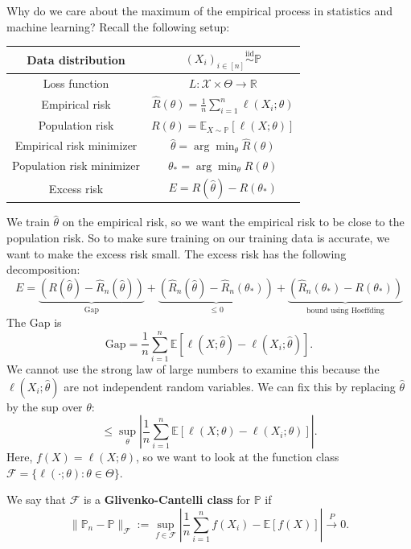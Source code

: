 Why do we care about the maximum of the empirical process in statistics and machine learning? Recall the following setup:
\begin{center}
\begin{tabular}{c|c}
Data distribution & $(X_i)_{i \in [n]} \overset{\text{iid}}{\sim} \mathbb{P}$ \\
\hline
Loss function & $L : \mathcal{X} \times \Theta \to \mathbb{R}$ \\
\hline
Empirical risk & $\widehat{R}(\theta) = \frac{1}{n} \sum_{i=1}^n \ell(X_i; \theta)$ \\
\hline
Population risk & $R(\theta) = \mathbb{E}_{X \sim \mathbb{P}}[\ell(X; \theta)]$ \\
\hline
Empirical risk minimizer & $\hat{\theta} = \arg\min_\theta \widehat{R}(\theta)$ \\
\hline
Population risk minimizer & $\theta_* = \arg\min_\theta R(\theta)$ \\
\hline
Excess risk & $E = R(\hat{\theta}) - R(\theta_*)$ \\
\end{tabular}
\end{center}

We train $\hat{\theta}$ on the empirical risk, so we want the empirical risk to be close to the population risk. So to make sure training on our training data is accurate, we want to make the excess risk small. The excess risk has the following decomposition:
\[
E = \underbrace{(R(\hat{\theta}) - \widehat{R}_n(\hat{\theta}))}_{\text{Gap}} + \underbrace{(\widehat{R}_n(\hat{\theta}) - \widehat{R}_n(\theta_*))}_{\leq 0} + \underbrace{(\widehat{R}_n(\theta_*) - R(\theta_*))}_{\text{bound using Hoeffding}}
\]
The Gap is
\[
\text{Gap} = \frac{1}{n} \sum_{i=1}^n \mathbb{E}[\ell(X; \hat{\theta}) - \ell(X_i; \hat{\theta})].
\]
We cannot use the strong law of large numbers to examine this because the $\ell(X_i; \hat{\theta})$ are not independent random variables. We can fix this by replacing $\hat{\theta}$ by the sup over $\theta$:
\[
\leq \sup_{\theta} \left| \frac{1}{n} \sum_{i=1}^n \mathbb{E}[\ell(X; \theta) - \ell(X_i; \theta)] \right|.
\]
Here, $f(X) = \ell(X; \theta)$, so we want to look at the function class $\mathcal{F} = \{\ell(\cdot; \theta) : \theta \in \Theta\}$.

\begin{defn}
We say that $\mathcal{F}$ is a \textbf{Glivenko-Cantelli class} for $\mathbb{P}$ if
\[
\|\mathbb{P}_n - \mathbb{P}\|_{\mathcal{F}} := \sup_{f \in \mathcal{F}} \left| \frac{1}{n} \sum_{i=1}^n f(X_i) - \mathbb{E}[f(X)] \right| \xrightarrow{P} 0.
\]
\end{defn}

